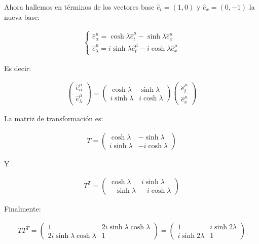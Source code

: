 Ahora hallemos en términos de los vectores base $\hat{e}_t=(1,0)$ y $\hat{e}_x=(0,-1)$ la nueva base:

\begin{align*}
    \begin{cases}
        \hat{e}_\alpha^\mu = \cosh\lambda\hat{e}_t^\mu-\sinh\lambda\hat{e}_x^\mu\\
        \hat{e}_\lambda^\mu = i\sinh\lambda\hat{e}_t^\mu-i\cosh\lambda\hat{e}_x^\mu
    \end{cases}
\end{align*}

Es decir:

\begin{align*}
    \begin{pmatrix}
        \hat{e}_\alpha^\mu \\ \hat{e}_\lambda^\mu
    \end{pmatrix} = 
    \begin{pmatrix}
        \cosh\lambda & \sinh\lambda\\
        i\sinh\lambda & i\cosh\lambda
    \end{pmatrix}
    \begin{pmatrix}
        \hat{e}_t^\mu\\\hat{e}_x^\mu
    \end{pmatrix}
\end{align*}

La matriz de transformación es:

\begin{align*}
    T = 
    \begin{pmatrix}
        \cosh\lambda & -\sinh\lambda\\
        i\sinh\lambda & -i\cosh\lambda
    \end{pmatrix}
\end{align*}


Y 

\begin{align*}
    T^{T} = 
    \begin{pmatrix}
        \cosh\lambda & i\sinh\lambda\\
        -\sinh\lambda & -i\cosh\lambda
    \end{pmatrix}
\end{align*}


Finalmente:

\begin{align*}
    TT^{T} =
    \begin{pmatrix}
        1   &  2i\sinh\lambda\cosh\lambda \\
        2i\sinh\lambda\cosh\lambda    & 1
    \end{pmatrix} =
    \begin{pmatrix}
        1   &  i\sinh2\lambda \\
        i\sinh2\lambda    & 1
    \end{pmatrix}
\end{align*}

